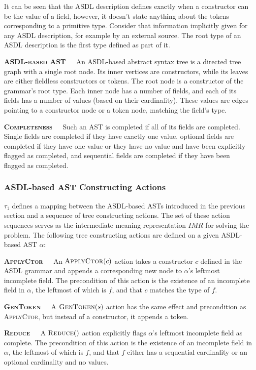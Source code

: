 \documentclass[12pt]{article}
\begin{document}
\noindent
It can be seen that the ASDL description defines exactly when a constructor can be the value of a field, however, it doesn't state anything about the tokens corresponding to a primitive type. Consider that information implicitly given for any ASDL description, for example by an external source. The root type of an ASDL description is the first type defined as part of it.

\textbf{\textsc{ASDL-based AST}}\ \ \ An ASDL-based abstract syntax tree is a directed tree graph with a single root node. Its inner vertices are constructors, while its leaves are either fieldless constructors or tokens. The root node is a constructor of the grammar's root type. Each inner node has a number of fields, and each of its fields has a number of values (based on their cardinality). These values are edges pointing to a constructor node or a token node, matching the field's type.

\textbf{\textsc{Completeness}}\ \ \ Such an AST is completed if all of its fields are completed. Single fields are completed if they have exactly one value, optional fields are completed if they have one value or they have no value and have been explicitly flagged as completed, and sequential fields are completed if they have been flagged as completed.

\subsubsection{ASDL-based AST Constructing Actions}

$\tau_{1}$ defines a mapping between the ASDL-based ASTs introduced in the previous section and a sequence of tree constructing actions. The set of these action sequences serves as the intermediate meaning representation $IMR$ for solving the problem. The following tree constructing actions are defined on a given ASDL-based AST $\alpha$:

\textbf{\textsc{ApplyCtor}}\ \ \ An $\textsc{ApplyCtor}(c)$ action takes a constructor $c$ defined in the ASDL grammar and appends a corresponding new node to $\alpha$'s leftmost incomplete field. The precondition of this action is the existence of an incomplete field in $\alpha$, the leftmost of which is $f$, and that $c$ matches the type of $f$.

\textbf{\textsc{GenToken}}\ \ \ A $\textsc{GenToken}(s)$ action has the same effect and precondition as \textsc{ApplyCtor}, but instead of a constructor, it appends a token.

\textbf{\textsc{Reduce}}\ \ \ A $\textsc{Reduce}()$ action explicitly flags $\alpha$'s leftmost incomplete field as complete. The precondition of this action is the existence of an incomplete field in $\alpha$, the leftmost of which is $f$, and that $f$ either has a sequential cardinality or an optional cardinality and no values.
\end{document}
